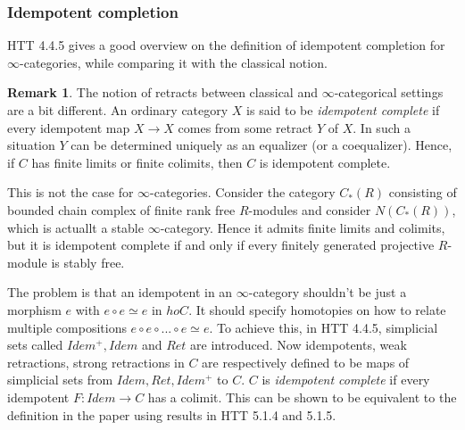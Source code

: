 \documentclass[letterpaper]{article}
\theoremstyle{definition}
\newtheorem{remark}[lemma]{Remark}
\begin{document}
\subsubsection{Idempotent completion}

HTT 4.4.5 gives a good overview on the definition of idempotent completion for $\infty$-categories, while comparing it with the classical notion. 

\begin{remark} The notion of retracts between classical and $\infty$-categorical settings are a bit different. An ordinary category $X$ is said to be \textit{idempotent complete} if every idempotent map $X \rightarrow X$ comes from some retract $Y$ of $X$. In such a situation $Y$ can be determined uniquely as an equalizer (or a coequalizer). Hence, if $C$ has finite limits or finite colimits, then $C$ is idempotent complete. 

This is not the case for $\infty$-categories. Consider the category $C_*(R)$ consisting of bounded chain complex of finite rank free $R$-modules and consider $N(C_*(R))$, which is actuallt a stable $\infty$-category. Hence it admits finite limits and colimits, but it is idempotent complete if and only if every finitely generated projective $R$-module is stably free. 

The problem is that an idempotent in an $\infty$-category shouldn't be just a morphism $e$ with $e \circ e \simeq e$ in $ho C$. It should specify homotopies on how to relate multiple compositions $e \circ e \circ ... \circ e \simeq e$. To achieve this, in HTT 4.4.5, simplicial sets called $Idem^+, Idem$ and $Ret$ are introduced. Now idempotents, weak retractions, strong retractions in $C$ are respectively defined to be maps of simplicial sets from $Idem, Ret, Idem^+$ to $C$. $C$ is \textit{idempotent complete} if every idempotent $F : Idem \rightarrow C$ has a colimit. This can be shown to be equivalent to the definition in the paper using results in HTT 5.1.4 and 5.1.5.
\end{remark}
\end{document}
